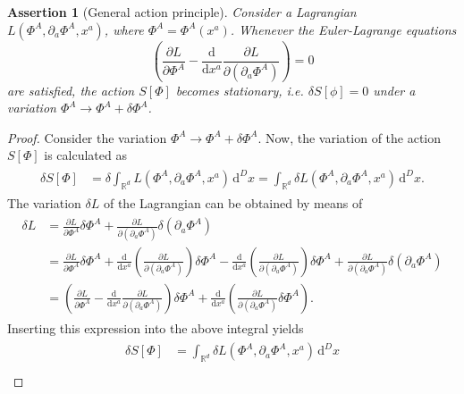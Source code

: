 \documentclass[a4paper,11pt]{article}
\numberwithin{equation}{section}
\newtheorem{ass}{Assertion}
\begin{document}
{\begin{ass}[General action principle]
Consider a Lagrangian $L(\Phi^A, \partial_a \Phi^A, x^a)$, where $\Phi^A = \Phi^A(x^a)$. Whenever the Euler-Lagrange equations \begin{equation}
\left(\frac{\partial L}{\partial \Phi^A}-\frac{\mathrm{d}}{\mathrm{d}x^a}\frac{\partial L}{\partial(\partial_a \Phi^A)}\right) = 0
\end{equation} are satisfied, the action $S[\Phi]$ becomes stationary, i.e. $\delta S[\phi] = 0$ under a variation $\Phi^A \rightarrow \Phi^A + \delta \Phi^A$.
\end{ass}
\begin{proof}
Consider the variation $\Phi^A \rightarrow \Phi^A + \delta \Phi^A$. Now, the variation of the action $S[\Phi]$ is calculated as 
\begin{align}
\begin{aligned}
\delta S[\Phi] &= \delta \int_{\mathbb{R}^d} L(\Phi^A,\partial_a\Phi^A, x^a)\,\mathrm{d}^Dx = \int_{\mathbb{R}^d} \delta L(\Phi^A,\partial_a\Phi^A, x^a)\,\mathrm{d}^Dx.
\end{aligned}
\end{align} The variation $\delta L$ of the Lagrangian can be obtained by means of \begin{align}
\begin{aligned}
\delta L &= \frac{\partial L}{\partial \Phi^A}\delta \Phi^A + \frac{\partial L}{\partial(\partial_a \Phi^A)}\delta (\partial_a\Phi^A) \\
&= \frac{\partial L}{\partial \Phi^A}\delta \Phi^A + \frac{\mathrm{d}}{\mathrm{d}x^a}\left(\frac{\partial L}{\partial(\partial_a\Phi^A)}\right)\delta \Phi^A - \frac{\mathrm{d}}{\mathrm{d}x^a}\left(\frac{\partial L}{\partial(\partial_a\Phi^A)}\right)\delta \Phi^A + \frac{\partial L}{\partial(\partial_a \Phi^A)}\delta (\partial_a\Phi^A) \\
&= \left(\frac{\partial L}{\partial \Phi^A}-\frac{\mathrm{d}}{\mathrm{d}x^a}\frac{\partial L}{\partial(\partial_a\Phi^A)}\right)\delta \Phi^A + \frac{\mathrm{d}}{\mathrm{d}x^a}\left(\frac{\partial L}{\partial(\partial_a\Phi^A)}\delta \Phi^A\right).
\end{aligned}
\end{align} Inserting this expression into the above integral yields \begin{align}
\begin{aligned}
\delta S[\Phi] &= \int_{\mathbb{R}^d} \delta L(\Phi^A,\partial_a\Phi^A, x^a)\,\mathrm{d}^Dx \\

\end{aligned}
\end{align}
\end{proof}}
\end{document}
